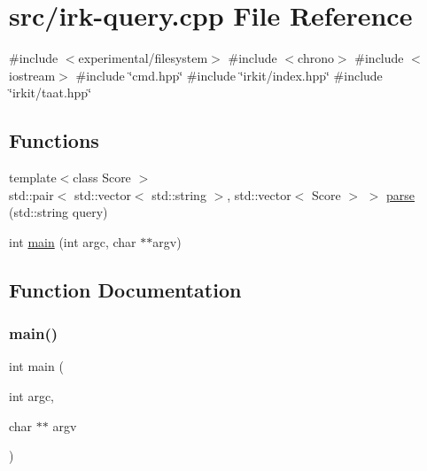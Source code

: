 \hypertarget{irk-query_8cpp}{}\section{src/irk-\/query.cpp File Reference}
\label{irk-query_8cpp}
{\ttfamily \#include $<$experimental/filesystem$>$}\newline
{\ttfamily \#include $<$chrono$>$}\newline
{\ttfamily \#include $<$iostream$>$}\newline
{\ttfamily \#include \char`\"{}cmd.\+hpp\char`\"{}}\newline
{\ttfamily \#include \char`\"{}irkit/index.\+hpp\char`\"{}}\newline
{\ttfamily \#include \char`\"{}irkit/taat.\+hpp\char`\"{}}\newline
\subsection*{Functions}
\begin{DoxyCompactItemize}
\item 
{\footnotesize template$<$class Score $>$ }\\std\+::pair$<$ std\+::vector$<$ std\+::string $>$, std\+::vector$<$ Score $>$ $>$ \mbox{\hyperlink{irk-query_8cpp_a72a7accc4aac02043b4942649bd3fe88}{parse}} (std\+::string query)
\item 
int \mbox{\hyperlink{irk-query_8cpp_a3c04138a5bfe5d72780bb7e82a18e627}{main}} (int argc, char $\ast$$\ast$argv)
\end{DoxyCompactItemize}


\subsection{Function Documentation}
\mbox{\label{irk-query_8cpp_a3c04138a5bfe5d72780bb7e82a18e627}} 
\subsubsection{\texorpdfstring{main()}{main()}}
{\footnotesize\ttfamily int main (\begin{DoxyParamCaption}\item[{int}]{argc,  }\item[{char $\ast$$\ast$}]{argv }\end{DoxyParamCaption})}

